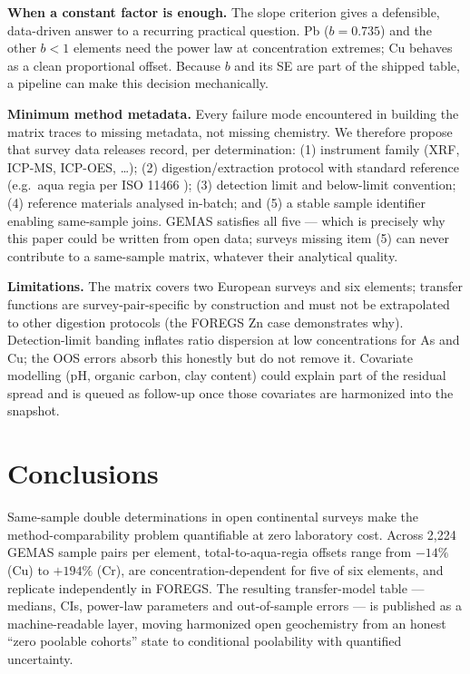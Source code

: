 \documentclass[11pt]{article}
\begin{document}
\textbf{When a constant factor is enough.} The slope criterion gives a
defensible, data-driven answer to a recurring practical question. Pb
($b{=}0.735$) and the other $b<1$ elements need the power law at
concentration extremes; Cu behaves as a clean proportional offset. Because
$b$ and its SE are part of the shipped table, a pipeline can make this
decision mechanically.

\textbf{Minimum method metadata.}
\label{sec:standard}
Every failure mode encountered in building the matrix traces to missing
metadata, not missing chemistry. We therefore propose that survey data
releases record, per determination: (1) instrument family (XRF, ICP-MS,
ICP-OES, \ldots); (2) digestion/extraction protocol with standard reference
(e.g.\ aqua regia per ISO 11466 \cite{iso11466}); (3) detection limit and
below-limit convention; (4) reference materials analysed in-batch; and (5)
a stable sample identifier enabling same-sample joins. GEMAS satisfies all
five --- which is precisely why this paper could be written from open data;
surveys missing item (5) can never contribute to a same-sample matrix,
whatever their analytical quality.

\textbf{Limitations.} The matrix covers two European surveys and six
elements; transfer functions are survey-pair-specific by construction and
must not be extrapolated to other digestion protocols (the FOREGS Zn case
demonstrates why). Detection-limit banding inflates ratio dispersion at low
concentrations for As and Cu; the OOS errors absorb this honestly but do
not remove it. Covariate modelling (pH, organic carbon, clay content) could
explain part of the residual spread and is queued as follow-up once those
covariates are harmonized into the snapshot.

\section{Conclusions}
Same-sample double determinations in open continental surveys make the
method-comparability problem quantifiable at zero laboratory cost. Across
2,224 GEMAS sample pairs per element, total-to-aqua-regia offsets range
from $-14\%$ (Cu) to $+194\%$ (Cr), are concentration-dependent for five of
six elements, and replicate independently in FOREGS. The resulting
transfer-model table --- medians, CIs, power-law parameters and
out-of-sample errors --- is published as a machine-readable layer, moving
harmonized open geochemistry from an honest ``zero poolable cohorts'' state
to conditional poolability with quantified uncertainty.
\end{document}
